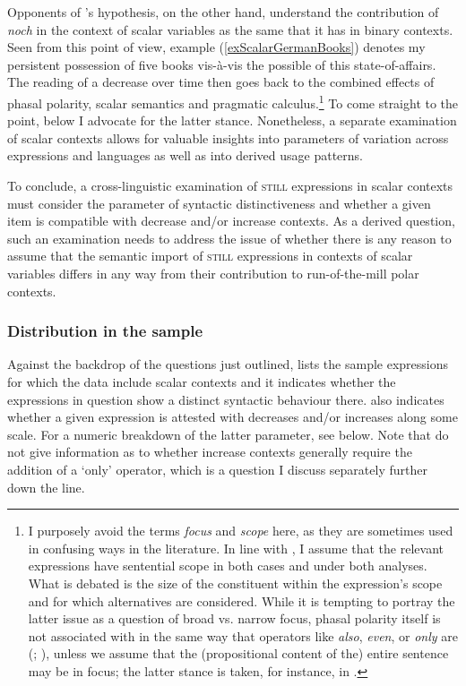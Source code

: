 Opponents of \citeauthor{Loebner1989}'s hypothesis, on the other hand, understand the contribution of \textit{noch} in the context of scalar variables as the same that it has in binary contexts. Seen from this point of view, example (\ref{exScalarGermanBooks}) denotes my persistent possession of five books vis-à-vis the possible  of this state-of-affairs. The reading of a decrease over time then goes back to the combined effects of phasal polarity, scalar semantics and pragmatic calculus.\footnote{I purposely avoid the terms \textit{focus}  and \textit{scope} here, as they are sometimes used in confusing ways in the literature. In line with \textcite{Loebner1989}, I assume that the relevant expressions have sentential scope in both cases and under both analyses. What is debated is the size of the constituent within the expression's scope and for which alternatives are considered. While it is tempting to portray the latter issue as a question of broad vs. narrow focus,  phasal polarity itself is not associated with  in the same way that operators like \textit{also}, \textit{even}, or \textit{only} are (\cite{Beck2020}; \cite{Klein2018}), unless we assume that the (propositional content of the) entire sentence may be in focus; the latter stance is taken, for instance, in \textcite{Krifka2000}.} To come straight to the point, below I advocate for the latter stance. Nonetheless, a separate examination of scalar contexts allows for valuable insights into parameters of variation across expressions and languages as well as into derived usage patterns.

To conclude, a cross-linguistic examination of \textsc{still} expressions in scalar contexts must consider the parameter of syntactic distinctiveness and whether a given item is compatible with decrease and/or increase contexts. As a derived question, such an examination needs to address the issue of whether there is any reason to assume that the semantic import of \textsc{still} expressions in contexts of scalar variables differs in any way from their contribution to run-of-the-mill polar contexts.

\subsubsection{Distribution in the sample}\largerpage
Against the backdrop of the questions just outlined,  lists the sample expressions for which the data include scalar contexts and it indicates whether the expressions in question show a distinct syntactic behaviour there.  also indicates whether a given expression is attested with decreases and/or increases along some scale. For a numeric breakdown of the latter parameter, see  below. Note that  do not give information as to whether increase contexts generally require the addition of a  \lq only\rq{ }operator, which is a question I discuss separately further down the line. 
 
